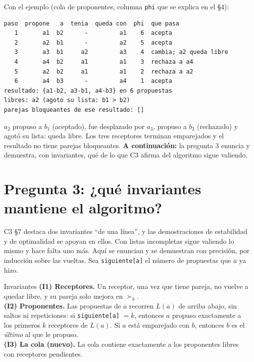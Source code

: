 \documentclass[11pt]{article}
\begin{document}
\noindent\begin{minipage}{\linewidth}
Con el ejemplo (cola de proponentes, columna \texttt{phi} que se explica en el §4):
\begin{lstlisting}[style=salida,basicstyle=\ttfamily\footnotesize\color{black},columns=fixed]
paso  propone   a  tenia  queda con  phi  que pasa
   1       a1  b2      -         a1    6  acepta
   2       a2  b1      -         a2    5  acepta
   3       a3  b1     a2         a3    4  cambia; a2 queda libre
   4       a4  b2     a1         a1    3  rechaza a a4
   5       a2  b2     a1         a1    2  rechaza a a2
   6       a4  b3      -         a4    1  acepta
resultado: {a1-b2, a3-b1, a4-b3} en 6 propuestas
libres: a2 (agoto su lista: b1 > b2)
parejas bloqueantes de ese resultado: []
\end{lstlisting}
\end{minipage}
$a_2$ propuso a $b_1$ (aceptado), fue desplazado por $a_3$, propuso a $b_2$ (rechazado) y agotó su lista:
queda libre. Los tres receptores terminan emparejados y el resultado no tiene parejas bloqueantes.
\textbf{A continuación:} la pregunta 3 enuncia y demuestra, con invariantes, qué de lo que C3 afirma del algoritmo sigue valiendo.

\section{Pregunta 3: ¿qué invariantes mantiene el algoritmo?}

C3 §7 destaca dos invariantes ``de una línea'', y las demostraciones de estabilidad y de optimalidad se apoyan
en ellos. Con listas incompletas sigue valiendo lo mismo y hace falta uno más. Aquí se enuncian y se demuestran
con precisión, por inducción sobre las vueltas. Sea \texttt{siguiente[a]} el número de propuestas que $a$ ya hizo.

\begin{resultado}{Invariantes}
\textbf{(I1) Receptores.} Un receptor, una vez que tiene pareja, no vuelve a quedar libre, y su pareja solo
mejora en $\succ_b$.\\
\textbf{(I2) Proponentes.} Las propuestas de $a$ recorren $L(a)$ de arriba abajo, sin saltos ni repeticiones: si
\texttt{siguiente[a]} $=k$, entonces $a$ propuso exactamente a los primeros $k$ receptores de $L(a)$. Si $a$
está emparejado con $b$, entonces $b$ es el \emph{último} al que le propuso.\\
\textbf{(I3) La cola (nuevo).} La cola contiene exactamente a los proponentes libres con receptores
pendientes.
\end{resultado}
\end{document}
